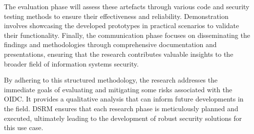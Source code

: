 The evaluation phase will assess these artefacts through various code and security testing methods to ensure their effectiveness and reliability. Demonstration involves showcasing the developed prototypes in practical scenarios to validate their functionality. Finally, the communication phase focuses on disseminating the findings and methodologies through comprehensive documentation and presentations, ensuring that the research contributes valuable insights to the broader field of information systems security.

By adhering to this structured methodology, the research addresses the immediate goals of evaluating and mitigating some risks associated with the OIDC. It provides a qualitative analysis that can inform future developments in the field. DSRM ensures that each research phase is meticulously planned and executed, ultimately leading to the development of robust security solutions for this use case.


